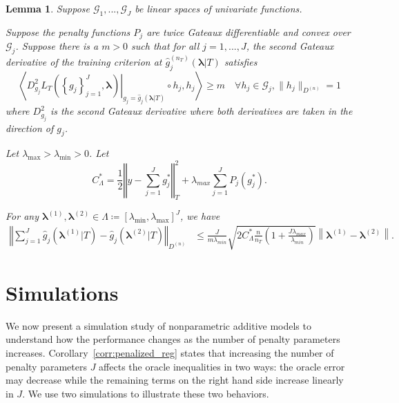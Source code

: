 \documentclass[12pt]{article} %
\newtheorem{lemma}{Lemma}
\theoremstyle{definition}
\begin{document}
\begin{lemma}
	\label{lemma:nonparam_smooth}
	Suppose $\mathcal{G}_1, ..., \mathcal{G}_J$ be linear spaces of univariate functions.
	
	Suppose the penalty functions $P_{j}$ are twice Gateaux differentiable and convex over $\mathcal{G}_j$. Suppose there is a $m > 0$ such that for all $j=1,...,J$, the second Gateaux derivative of the training criterion at $\hat{g}^{(n_T)}_j( \boldsymbol{\lambda} | T)$ satisfies
	\begin{equation}
	\left \langle 
	\left . D^2_{g_j} L_T \left ( \left \{ g_j \right \}_{j=1}^J, \boldsymbol{\lambda} \right ) \right |_{g_j= \hat{g}_j( \boldsymbol{\lambda} | T) }
	\circ h_j, h_j
	\right \rangle 
	\ge m
	\quad \forall h_j \in \mathcal{G}_j,  \|h_j \|_{D^{(n)}} = 1
	\label{eq:gateuax}
	\end{equation}
	where $D^2_{g_j}$ is the second Gateaux derivative where both derivatives are taken in the direction of $g_j$.
	
	Let $\lambda_{\max} > \lambda_{\min} > 0 $. Let
	\begin{equation}
	C_{\Lambda}^*=
	\frac{1}{2}\left\Vert y- \sum_{j=1}^J g^*_j\right\Vert _{T}^{2}
	+\lambda_{max}\sum_{j=1}^{J} P_{j}(g^*_j).
	\end{equation}
	
	For any $\boldsymbol{\lambda}^{(1)}, \boldsymbol{\lambda}^{(2)} \in \Lambda \coloneqq \left [ \lambda_{\min}, \lambda_{\max} \right ]^J$, we have
	\begin{align}
	\label{eq:nonparam_lipshitz_thrm}
	\left\Vert 
	\sum_{j=1}^J \hat{g}_j\left(\boldsymbol{\lambda}^{(1)} |T \right)-\hat{g}_j\left(\boldsymbol{\lambda}^{(2)} |T \right)\right\Vert _{D^{(n)}} & \le
	\frac{J}{m \lambda_{min}}\sqrt{2 C_{\Lambda}^* \frac{n}{n_{T}}\left(1+\frac{J\lambda_{max}}{\lambda_{min}}\right)}
	\left \|\boldsymbol{\lambda}^{(1)}-\boldsymbol{\lambda}^{(2)} \right \|.
	\end{align}
\end{lemma}


\section{Simulations}\label{sec:simulations}

We now present a simulation study of nonparametric additive models to understand how the performance changes as the number of penalty parameters increases. 
Corollary~\ref{corr:penalized_reg} states that increasing the number of penalty parameters $J$ affects the oracle inequalities in two ways: the oracle error may decrease while the remaining terms on the right hand side increase linearly in $J$. We use two simulations to illustrate these two behaviors.
\end{document}
